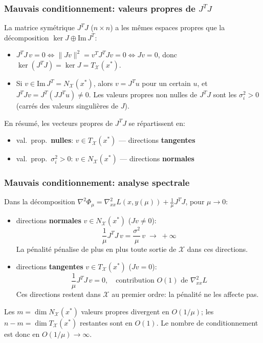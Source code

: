 \documentclass[t,usepdftitle=false,aspectratio=169]{beamer}
\def\cX{\mathcal{X}}
\begin{document}
\begin{frame}
\frametitle{Mauvais conditionnement: valeurs propres de $J^TJ$}

La matrice symétrique $J^TJ$ ($n \times n$) a les mêmes espaces propres que la décomposition $\ker J \oplus \mathrm{Im}\,J^T$:

\begin{itemize}
\item $J^TJ\,v = 0 \Leftrightarrow \|Jv\|^2 = v^TJ^TJv = 0 \Leftrightarrow Jv = 0$, donc $\ker(J^TJ) = \ker J = T_{\cX}(x^*)$.
\item Si $v \in \mathrm{Im}\,J^T = N_{\cX}(x^*)$, alors $v = J^Tu$ pour un certain $u$, et $J^TJv = J^T(JJ^Tu) \ne 0$. Les valeurs propres non nulles de $J^TJ$ sont les $\sigma_i^2 > 0$ (carrés des valeurs singulières de $J$).
\end{itemize}

\mbox{}

En résumé, les vecteurs propres de $J^TJ$ se répartissent en:
\begin{itemize}
  \item val.\ prop.\ \textbf{nulles}: $v \in T_{\cX}(x^*)$ --- directions \textbf{tangentes}
  \item val.\ prop.\ $\sigma_i^2>0$: $v \in N_{\cX}(x^*)$ --- directions \textbf{normales}
\end{itemize}

\end{frame}

\begin{frame}
\frametitle{Mauvais conditionnement: analyse spectrale}

Dans la décomposition $\nabla^2\Phi_\mu = \nabla^2_{xx}L(x,y(\mu)) + \frac{1}{\mu}J^TJ$, pour $\mu \rightarrow 0$:
\begin{itemize}
  \item directions \textbf{normales} $v \in N_{\cX}(x^*)$ ($Jv \ne 0$):
  $$\frac{1}{\mu}J^TJ\,v = \frac{\sigma^2}{\mu}\,v \;\longrightarrow\; +\infty$$
  La pénalité pénalise de plus en plus toute sortie de $\cX$ dans ces directions.
  \item directions \textbf{tangentes} $v \in T_{\cX}(x^*)$ ($Jv = 0$):
  $$\frac{1}{\mu}J^TJ\,v = 0, \quad \text{contribution } O(1) \text{ de } \nabla^2_{xx}L$$
  Ces directions restent dans $\cX$ au premier ordre: la pénalité ne les affecte pas.
\end{itemize}

\mbox{}

Les $m = \dim N_{\cX}(x^*)$ valeurs propres divergent en $O(1/\mu)$; les $n-m = \dim T_{\cX}(x^*)$ restantes sont en $O(1)$. Le nombre de conditionnement est donc en $O(1/\mu) \rightarrow \infty$.

\end{frame}
\end{document}
